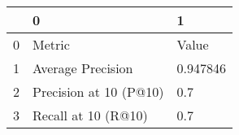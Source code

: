 \begin{tabular}{lll}
\toprule
{} &                       0 &         1 \\
\midrule
0 &                  Metric &     Value \\
1 &       Average Precision &  0.947846 \\
2 &  Precision at 10 (P@10) &       0.7 \\
3 &     Recall at 10 (R@10) &       0.7 \\
\bottomrule
\end{tabular}
